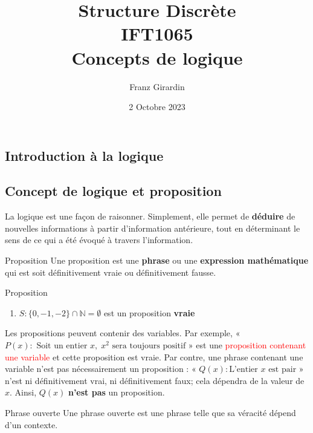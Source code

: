 \documentclass[16pt]{report}
\title{\Huge{Structure Discrète}\\{IFT1065}\\{\textbf{Concepts de logique}}}
\author{\huge{Franz Girardin}}
\date{2 Octobre 2023}
\begin{document}
\maketitle
\pagebreak
\tableofcontents 
\pagebreak

\pagebreak
\begin{multicols*}{2}
        \chapter{Introduction à la logique}
        \section{Concept de logique et proposition}
                La logique est une façon de raisonner. Simplement, elle permet de \textbf{déduire} de nouvelles
                informations à partir d'information antérieure, tout en déterminant le sens de ce qui a été évoqué à 
                travers l'information.

        \begin{Definitionx}{Proposition}{}
            Une proposition est une \textbf{phrase} ou une \textbf{expression mathématique} qui est soit 
            définitivement vraie ou définitivement fausse. 
        \end{Definitionx}


        \begin{EExample}{Proposition}{}
                \begin{enumerate}
                    \item $S : \{0, -1, -2 \} \cap \mathbb{N} = \emptyset$ est un proposition \textbf{vraie} \\ 
                \end{enumerate}
        \end{EExample}


                Les propositions peuvent contenir des variables. Par exemple, 
                « \textbf{$P(x) : \text{ Soit un entier } x, \; x^2 \text{ sera toujours positif} $} » est 
                une \textcolor{red}{proposition contenant une variable} et cette proposition est vraie. 
                Par contre, une phrase contenant une variable n'est pas nécessairement un proposition :
                « $Q(x) : \text{L'entier } x \text{ est pair}$ » n'est ni définitivement vrai, ni définitivement 
                faux; cela dépendra de la valeur de $x$. Ainsi, $Q(x)$ \textbf{n'est pas} un proposition.   

        \begin{Definitionx}{Phrase ouverte}{}
            Une phrase ouverte est une phrase telle que sa véracité dépend d'un contexte. 
        \end{Definitionx}
        


\end{multicols*}
\end{document}
